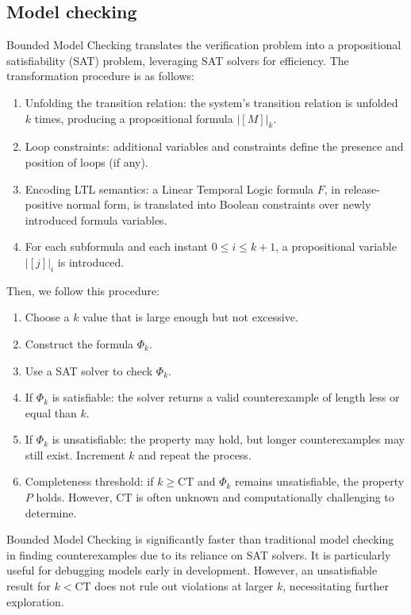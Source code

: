 \subsection{Model checking}
Bounded Model Checking translates the verification problem into a propositional satisfiability (SAT) problem, leveraging SAT solvers for efficiency.
The transformation procedure is as follows: 
\begin{enumerate}
    \item Unfolding the transition relation: the system's transition relation is unfolded $k$ times, producing a propositional formula ${\left\lvert [M]\right\rvert }_k$. 
    \item Loop constraints: additional variables and constraints define the presence and position of loops (if any). 
    \item Encoding LTL semantics: a Linear Temporal Logic formula $F$, in release-positive normal form, is translated into Boolean constraints over newly introduced formula variables.
    \item For each subformula and each instant $0\leq i \leq k+1$, a propositional variable ${\left\lvert [j]\right\rvert }_i$ is introduced.
\end{enumerate}
\noindent Then, we follow this procedure: 
\begin{enumerate}
    \item Choose a $k$ value that is large enough but not excessive.
    \item Construct the formula $\Phi_k$.
    \item Use a SAT solver to check $\Phi_k$. 
    \item If $\Phi_k$ is satisfiable: the solver returns a valid counterexample of length less or equal than $k$.
    \item If $\Phi_k$ is unsatisfiable: the property may hold, but longer counterexamples may still exist. 
        Increment $k$ and repeat the process.
    \item Completeness threshold: if $k\geq\text{CT}$ and $\Phi_k$ remains unsatisfiable, the property $P$ holds. 
        However, $\text{CT}$ is often unknown and computationally challenging to determine.
\end{enumerate}
\noindent Bounded Model Checking is significantly faster than traditional model checking in finding counterexamples due to its reliance on SAT solvers.
It is particularly useful for debugging models early in development.
However, an unsatisfiable result for $k<\text{CT}$ does not rule out violations at larger $k$, necessitating further exploration.